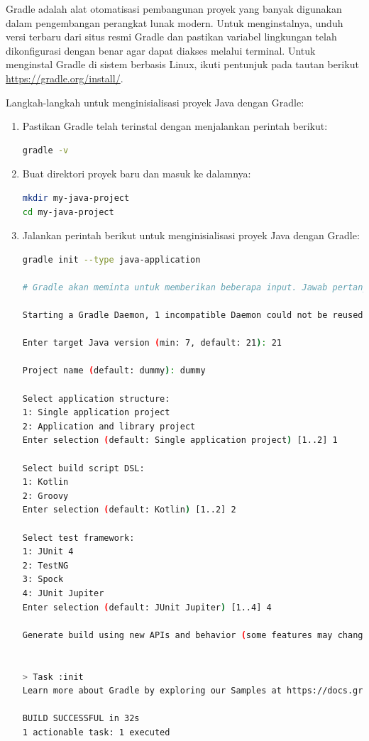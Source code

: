 Gradle adalah alat otomatisasi pembangunan proyek yang banyak digunakan dalam pengembangan perangkat lunak modern. Untuk menginstalnya, unduh versi terbaru dari situs resmi Gradle dan pastikan variabel lingkungan telah dikonfigurasi dengan benar agar dapat diakses melalui terminal. Untuk menginstal Gradle di sistem berbasis Linux, ikuti pentunjuk pada tautan berikut \url{https://gradle.org/install/}.


Langkah-langkah untuk menginisialisasi proyek Java dengan Gradle:

\begin{enumerate}
\item Pastikan Gradle telah terinstal dengan menjalankan perintah berikut:
\begin{lstlisting}[language=bash]
gradle -v
\end{lstlisting}

\item Buat direktori proyek baru dan masuk ke dalamnya:
\begin{lstlisting}[language=bash]
mkdir my-java-project
cd my-java-project
\end{lstlisting}

\item Jalankan perintah berikut untuk menginisialisasi proyek Java dengan Gradle:
\begin{lstlisting}[language=bash]
gradle init --type java-application

# Gradle akan meminta untuk memberikan beberapa input. Jawab pertanyaan-pertanyaan tersebut seperti berikut.

Starting a Gradle Daemon, 1 incompatible Daemon could not be reused, use --status for details

Enter target Java version (min: 7, default: 21): 21

Project name (default: dummy): dummy

Select application structure:
1: Single application project
2: Application and library project
Enter selection (default: Single application project) [1..2] 1

Select build script DSL:
1: Kotlin
2: Groovy
Enter selection (default: Kotlin) [1..2] 2

Select test framework:
1: JUnit 4
2: TestNG
3: Spock
4: JUnit Jupiter
Enter selection (default: JUnit Jupiter) [1..4] 4

Generate build using new APIs and behavior (some features may change in the next minor release)? (default: no) [yes, no] no


> Task :init
Learn more about Gradle by exploring our Samples at https://docs.gradle.org/8.13/samples/sample_building_java_applications.html

BUILD SUCCESSFUL in 32s
1 actionable task: 1 executed
\end{lstlisting}
\end{enumerate}

